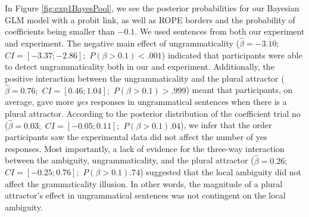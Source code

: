 In Figure \ref{fig:exp1BayesPool}, we see the posterior probabilities for our Bayesian GLM model with a probit link, as well as ROPE borders and the probability of coefficients being smaller than $-0.1$. We used sentences from both our experiment and \cites{LagoEtAl2019} experiment. The negative main effect of ungrammaticality ($\hat{\beta}=-3.10;$ $CI=[-3.37; -2.86];$ $P(\beta>0.1)< .001$) indicated that participants were able to detect ungrammaticality both in our and \cites{LagoEtAl2019} experiment. Additionally, the positive interaction between the ungrammaticality and the plural attractor ($\hat{\beta}=0.76;$ $CI=[0.46; 1.04];$ $P(\beta>0.1)> .999$) meant that participants, on average, gave more \textit{yes} responses in ungrammatical sentences when there is a plural attractor. According to the posterior distribution of the coefficient trial no ($\hat{\beta}=0.03;$ $CI=[-0.05; 0.11];$ $P(\beta>0.1)   .04$), we infer that the order participants saw the experimental data did not affect the number of yes responses. Most importantly, a lack of evidence for the three-way interaction between the ambiguity, ungrammaticality, and the plural attractor ($\hat{\beta}=0.26;$ $CI=[-0.25; 0.76];$ $P(\beta>0.1)   .74$) suggested that the local ambiguity did not affect the grammaticality illusion. In other words, the magnitude of a plural attractor's effect in ungrammatical sentences was not contingent on the local ambiguity.


